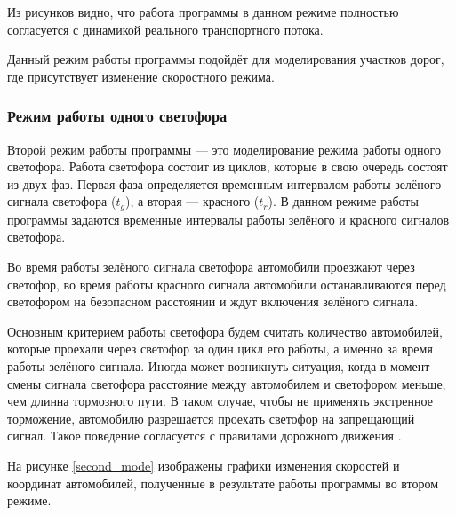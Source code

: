 \documentclass[12pt, a4paper]{extarticle}
\numberwithin{equation}{section}
\numberwithin{figure}{section}
\begin{document}
Из рисунков видно, что работа программы в данном режиме полностью согласуется с динамикой реального транспортного потока.

Данный режим работы программы подойдёт для моделирования участков дорог, где присутствует изменение скоростного режима.

\subsubsection{Режим работы одного светофора}

Второй режим работы программы --- это моделирование режима работы одного светофора. Работа светофора состоит из циклов, которые в свою очередь состоят из двух фаз. Первая фаза определяется временным интервалом работы зелёного сигнала светофора ($t_g$), а вторая --- красного ($t_r$). В данном режиме работы программы задаются временные интервалы работы зелёного и красного сигналов светофора. 

Во время работы зелёного сигнала светофора автомобили проезжают через светофор, во время работы красного сигнала автомобили останавливаются перед светофором на безопасном расстоянии и ждут включения зелёного сигнала. 

Основным критерием работы светофора будем считать количество автомобилей, которые проехали через светофор за один цикл его работы, а именно за время работы зелёного сигнала. Иногда может возникнуть ситуация, когда в момент смены сигнала светофора расстояние между автомобилем и светофором меньше, чем длинна тормозного пути. В таком случае, чтобы не применять экстренное торможение, автомобилю разрешается проехать светофор на запрещающий сигнал. Такое поведение согласуется с правилами дорожного движения \cite{PDD}.

На рисунке \ref{second_mode} изображены графики изменения скоростей и координат автомобилей, полученные в результате работы программы во втором режиме.
\end{document}
